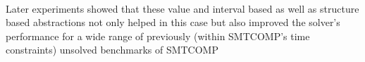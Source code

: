 \paragraph{}
Later experiments showed that these value and interval based as well as structure based abstractions not only helped in this case but also improved the solver's performance for a wide range of previously (within SMTCOMP's time constraints) unsolved benchmarks of SMTCOMP 